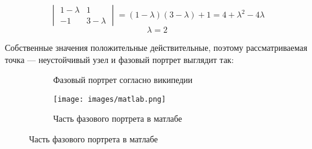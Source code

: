 \[\begin{vmatrix} 1 - \lambda & 1 \\ - 1 & 3 - \lambda \end{vmatrix} = (1 - \lambda)(3 - \lambda) + 1 = 4 + \lambda^2 - 4 \lambda\]
\[\lambda = 2\]

Собственные значения положительные действительные, поэтому рассматриваемая точка --- неустойчивый узел и фазовый портрет выглядит так:

\begin{figure}[h]
    \centering
    \begin{subfigure}{.45\textwidth}
        \centering
        
        \caption{Фазовый портрет согласно википедии}
    \end{subfigure}
    \begin{subfigure}{.45\textwidth}
        \centering
        \texttt{[image: images/matlab.png]}
        \caption{Часть фазового портрета в матлабе}
    \end{subfigure}
\end{figure}

